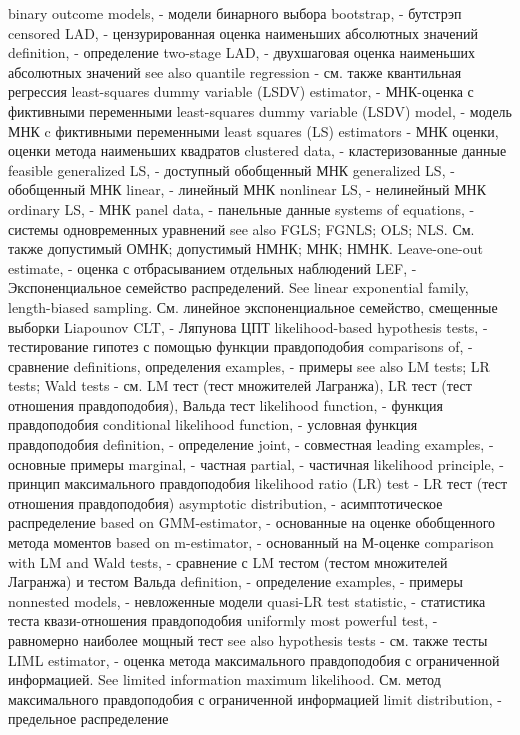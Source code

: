 binary outcome models, - модели бинарного выбора
bootstrap, - бутстрэп
censored LAD, - цензурированная оценка наименьших абсолютных значений
definition, - определение
two-stage LAD, - двухшаговая оценка наименьших абсолютных значений
see also quantile regression - см. также квантильная регрессия
least-squares dummy variable (LSDV) estimator, - МНК-оценка с фиктивными переменными
least-squares dummy variable (LSDV) model, - модель МНК c фиктивными переменными 
least squares (LS) estimators - МНК оценки, оценки метода наименьших квадратов
clustered data, - кластеризованные данные
feasible generalized LS, - доступный обобщенный МНК
generalized LS, - обобщенный МНК
linear, - линейный МНК
nonlinear LS, - нелинейный МНК
ordinary LS, - МНК
panel data, - панельные данные
systems of equations, - системы одновременных уравнений
see also FGLS; FGNLS; OLS; NLS. См. также допустимый ОМНК; допустимый НМНК; МНК; НМНК.
Leave-one-out estimate, - оценка с отбрасыванием отдельных наблюдений
LEF, - Экспоненциальное семейство распределений. 
See linear exponential family, length-biased sampling. См. линейное экспоненциальное семейство, смещенные выборки
Liapounov CLT, - Ляпунова ЦПТ
likelihood-based hypothesis tests, - тестирование гипотез с помощью функции правдоподобия
comparisons of, - сравнение 
definitions, определения
examples, - примеры
see also LM tests; LR tests; Wald tests - см. LM тест (тест множителей Лагранжа), LR тест (тест отношения правдоподобия), Вальда тест
likelihood function, - функция правдоподобия
conditional likelihood function, - условная функция правдоподобия
definition, - определение
joint, - совместная
leading examples, - основные примеры
marginal, - частная
partial, - частичная
likelihood principle, - принцип максимального правдоподобия
likelihood ratio (LR) test - LR тест (тест отношения правдоподобия)
asymptotic distribution, - асимптотическое распределение
based on GMM-estimator, - основанные на оценке обобщенного метода моментов
based on m-estimator, - основанный на М-оценке
comparison with LM and Wald tests, - сравнение с LM тестом (тестом множителей Лагранжа) и тестом Вальда
definition, - определение
examples, - примеры
nonnested models, - невложенные модели
quasi-LR test statistic, - статистика теста квази-отношения правдоподобия
uniformly most powerful test, - равномерно наиболее мощный тест
see also hypothesis tests - см. также тесты
LIML estimator, - оценка метода максимального правдоподобия с ограниченной информацией.  See limited information maximum likelihood. См. метод максимального правдоподобия с ограниченной информацией 
limit distribution, - предельное распределение
